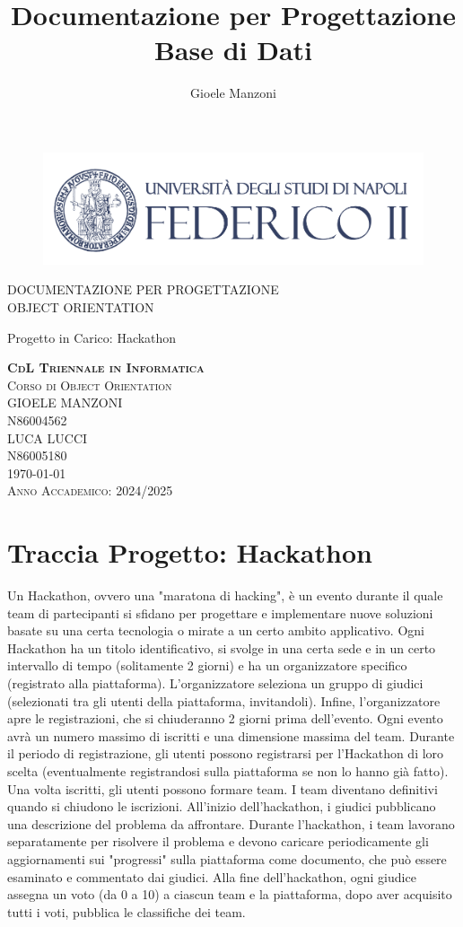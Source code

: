 \documentclass[a4paper, 15pt, oneside]{article}
\author{Gioele Manzoni}
\title{Documentazione per Progettazione Base di Dati}
\begin{document}
	\begin{center}
		\begin{figure}[hb]
			\includegraphics[width=1\textwidth]{Immagini/coverpic}
		\end{figure}
		{\LARGE DOCUMENTAZIONE PER PROGETTAZIONE \\ OBJECT ORIENTATION \par}
		{\Large{Progetto in Carico: Hackathon \par}}
		\vfill
		{\large{ \textbf{\textsc{CdL Triennale in Informatica}}}}\\
		{\large{\textsc{Corso di Object Orientation}}}\\
		{\large{\textsc{GIOELE MANZONI}}}\\
		{\large{\textsc{N86004562}}}\\
		{\large{\textsc{LUCA LUCCI}}}\\
		{\large{\textsc{N86005180}}}\\
		{\large{\textsc{\today}}}\\
		\Large{\textsc{Anno Accademico: 2024/2025}}
	\end{center}
	\newpage
	\tableofcontents
	\newpage
	\section{Traccia Progetto: Hackathon}
	Un Hackathon, ovvero una "maratona di hacking", è un evento durante il quale team di partecipanti si sfidano per progettare e implementare nuove soluzioni basate su una certa tecnologia o mirate a un certo ambito applicativo. 
	Ogni Hackathon ha un titolo identificativo, si svolge in una certa sede e in un certo intervallo di tempo (solitamente 2 giorni) e ha un organizzatore specifico (registrato alla piattaforma). L'organizzatore seleziona un gruppo di giudici (selezionati tra gli utenti della piattaforma, invitandoli). Infine, l'organizzatore apre le registrazioni, che si chiuderanno 2 giorni prima dell'evento. Ogni evento avrà un numero massimo di iscritti e una dimensione massima del team.
	Durante il periodo di registrazione, gli utenti possono registrarsi per l'Hackathon di loro scelta (eventualmente registrandosi sulla piattaforma se non lo hanno già fatto). Una volta iscritti, gli utenti possono formare team. I team diventano definitivi quando si chiudono le iscrizioni. All'inizio dell'hackathon, i giudici pubblicano una descrizione del problema da affrontare. 
	Durante l'hackathon, i team lavorano separatamente per risolvere il problema e devono caricare periodicamente gli aggiornamenti sui "progressi" sulla piattaforma come documento, che può essere esaminato e commentato dai giudici. Alla fine dell'hackathon, ogni giudice assegna un voto (da 0 a 10) a ciascun team e la piattaforma, dopo aver acquisito tutti i voti, pubblica le classifiche dei team.
\end{document}
